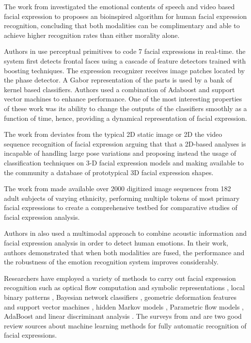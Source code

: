 \documentclass[]{article}
\begin{document}
The work from \cite{Chen670976} investigated the emotional contents of speech and video based facial expression to
proposes an bioinspired algorithm for human facial expression recognition, concluding that both modalities can be
complimentary and able to achieve higher recognition rates than either morality alone.


Authors in \cite{Bartlett4624313} use perceptual primitives to code 7 facial expressions in real-time. the system first
detects frontal faces using a cascade of feature detectors trained with boosting techniques. The expression recognizer
receives image patches located by the phase detector. A Gabor representation of the parts is used  by a bank of kernel
based classifiers. Authors used a combination of Adaboost and support vector machines to enhance performance. One of the
most interesting properties of these work was its ability to change the outputs of the classifiers smoothly as a
function of time, hence, providing a dynamical representation of facial expression.

The work from \cite{lijunyin} deviates from the typical 2D static image or 2D the video sequence recognition of
facial expression arguing that that a 2D-based analyses is incapable of handling large pose variations and proposing
instead the usage of classification techniques on 3-D facial expression models and making available to the community a
database of prototypical 3D facial expression shapes.
 
The work from \cite{Cohn840611} made available over 2000 digitized image sequences from  182 adult subjects of
varying ethnicity, performing multiple tokens of most primary facial expressions to create a comprehensive testbed for
comparative studies of facial expression analysis.

Authors in \cite{Busso:2004} also used a multimodal approach to combine acoustic information and facial expression
analysis in order to detect human emotions. In their work, authors demonstrated that when both modalities are fused, the performance
and the robustness of the emotion recognition system improves considerably.


Researchers have employed a variety of methods to carry out facial expression recognition such as optical flow
computation  and symbolic representations \cite{Yacoob506414}, local binary patterns \cite{Shan2009803},  Bayesian
network classifiers \cite{Cohen1211408}, geometric deformation features and support vector machines
\cite{kotsia4032815}, hidden Markov models \cite{aleksic1597130, Cohen2003160}, Parametric flow models
\cite{blackAndYacoob}, AdaBoost and linear discriminant analysis \cite{bartlett1398364}. The surveys from
\cite{bartlett1398364} and \cite{Fasel2003259} are two good review sources about machine learning methods 
for fully automatic recognition of facial expressions. 
\end{document}

